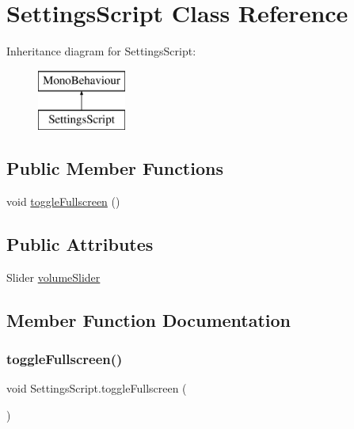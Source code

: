 \hypertarget{class_settings_script}{}\section{Settings\+Script Class Reference}
\label{class_settings_script}
Inheritance diagram for Settings\+Script\+:\begin{figure}[H]
\begin{center}
\leavevmode
\includegraphics[height=2.000000cm]{class_settings_script}
\end{center}
\end{figure}
\subsection*{Public Member Functions}
\begin{DoxyCompactItemize}
\item 
void \hyperlink{class_settings_script_a180f9bd5c3489838bf85b8d7e6377b53}{toggle\+Fullscreen} ()
\end{DoxyCompactItemize}
\subsection*{Public Attributes}
\begin{DoxyCompactItemize}
\item 
Slider \hyperlink{class_settings_script_ad08bdea1b11fad7c975f6ec3449c575a}{volume\+Slider}
\end{DoxyCompactItemize}


\subsection{Member Function Documentation}
\mbox{\label{class_settings_script_a180f9bd5c3489838bf85b8d7e6377b53}} 
\subsubsection{\texorpdfstring{toggle\+Fullscreen()}{toggleFullscreen()}}
{\footnotesize\ttfamily void Settings\+Script.\+toggle\+Fullscreen (\begin{DoxyParamCaption}{ }\end{DoxyParamCaption})}



